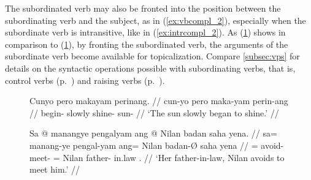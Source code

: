 The subordinated verb may also be fronted into the position between the
subordinating verb and the subject, as in (\ref{ex:vbcompl_2}), especially when
the subordinate verb is intransitive, like  in
(\ref{ex:intrcompl_2}). As (\ref{ex:trcompl_2}) shows in comparison to
(\ref{ex:trcompl_2}), by fronting the subordinated verb, the arguments of the
subordinate verb become available for topicalization. Compare
\autoref{subsec:vps} for details on the syntactic operations possible with
subordinating verbs, that is, control verbs (p.~\pageref{subsubsec:ctrlvb}) and
raising verbs (p.~\pageref{subsubsec:raisvb}).

\begin{figure}[h]
\pex\label{ex:vbcompl_2}
\a\label{ex:intrcompl_2}\begingl
	\gla Cunyo pero makayam perinang. // 
	\glb cun-yo pero maka-yam perin-ang // 
	\glc begin-\TsgN{} slowly shine-\Ptcp{} sun-\Aarg{} //
	\glft `The sun slowly began to shine.' //
\endgl

\a\label{ex:trcompl_2}\begingl
	\gla Sa @ manangye pengalyam ang @ Nilan badan saha yena. //
	\glb sa= manang-ye pengal-yam ang= Nilan badan-Ø saha yena //
	\glc \PatT{}= avoid-\TsgF{} meet-\Ptcp{} \Aarg{}= Nilan father-\Parg{}
		in.law \TsgF{}.\Gen{} //
	\glft `Her father-in-law, Nilan avoids to meet him.' //
\endgl
\xe
\end{figure}




